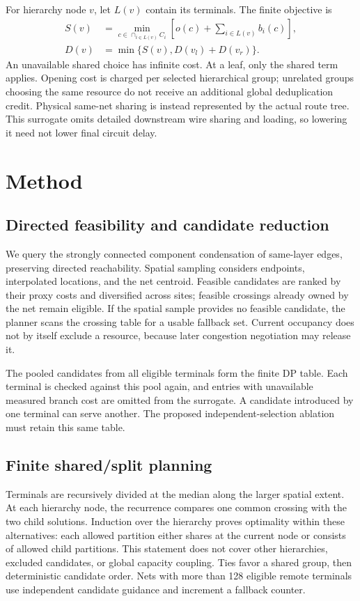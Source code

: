 \documentclass[conference,10pt]{IEEEtran}
\begin{document}
For hierarchy node $v$, let $L(v)$ contain its terminals. The finite objective is
\begin{equation}
 \begin{aligned}
 S(v)&=\min_{c\in\cap_{i\in L(v)}C_i}\left[o(c)+\sum_{i\in L(v)}b_i(c)\right],\\
 D(v)&=\min\{S(v),D(v_l)+D(v_r)\}.
\end{aligned}
\end{equation}
An unavailable shared choice has infinite cost. At a leaf, only the shared term applies. Opening cost is charged per selected hierarchical group; unrelated groups choosing the same resource do not receive an additional global deduplication credit. Physical same-net sharing is instead represented by the actual route tree. This surrogate omits detailed downstream wire sharing and loading, so lowering it need not lower final circuit delay.

\section{Method}
\subsection{Directed feasibility and candidate reduction}
We query the strongly connected component condensation of same-layer edges, preserving directed reachability. Spatial sampling considers endpoints, interpolated locations, and the net centroid. Feasible candidates are ranked by their proxy costs and diversified across sites; feasible crossings already owned by the net remain eligible. If the spatial sample provides no feasible candidate, the planner scans the crossing table for a usable fallback set. Current occupancy does not by itself exclude a resource, because later congestion negotiation may release it.

The pooled candidates from all eligible terminals form the finite DP table. Each terminal is checked against this pool again, and entries with unavailable measured branch cost are omitted from the surrogate. A candidate introduced by one terminal can serve another. The proposed independent-selection ablation must retain this same table.

\subsection{Finite shared/split planning}
Terminals are recursively divided at the median along the larger spatial extent. At each hierarchy node, the recurrence compares one common crossing with the two child solutions. Induction over the hierarchy proves optimality within these alternatives: each allowed partition either shares at the current node or consists of allowed child partitions. This statement does not cover other hierarchies, excluded candidates, or global capacity coupling. Ties favor a shared group, then deterministic candidate order. Nets with more than 128 eligible remote terminals use independent candidate guidance and increment a fallback counter.
\end{document}
